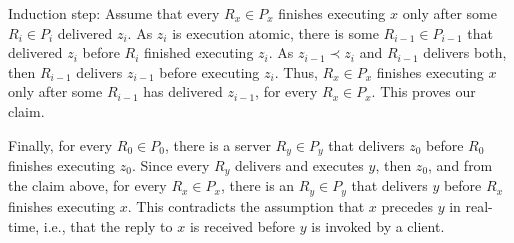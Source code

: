 Induction step: Assume that every $R_x \in P_x$ finishes executing $x$ only after some $R_i \in P_i$ delivered $z_i$. As $z_i$ is execution atomic, there is some $R_{i-1} \in P_{i-1}$ that delivered $z_i$ before $R_i$ finished executing $z_i$. As $z_{i-1} \prec z_i$ and $R_{i-1}$ delivers both, then $R_{i-1}$ delivers $z_{i-1}$ before executing $z_i$. Thus, $R_x \in P_x$ finishes executing $x$ only after some $R_{i-1}$ has delivered $z_{i-1}$, for every $R_x \in P_x$. This proves our claim.

Finally, for every $R_0 \in P_0$, there is a server $R_y \in P_y$ that delivers $z_0$ before $R_0$ finishes executing $z_0$. Since every $R_y$ delivers and executes $y$, then $z_0$, and from the claim above, for every $R_x \in P_x$, there is an $R_y \in P_y$ that delivers $y$ before $R_x$ finishes executing $x$. This contradicts the assumption that $x$ precedes $y$ in real-time, i.e., that the reply to $x$ is received before $y$ is invoked by a client.



